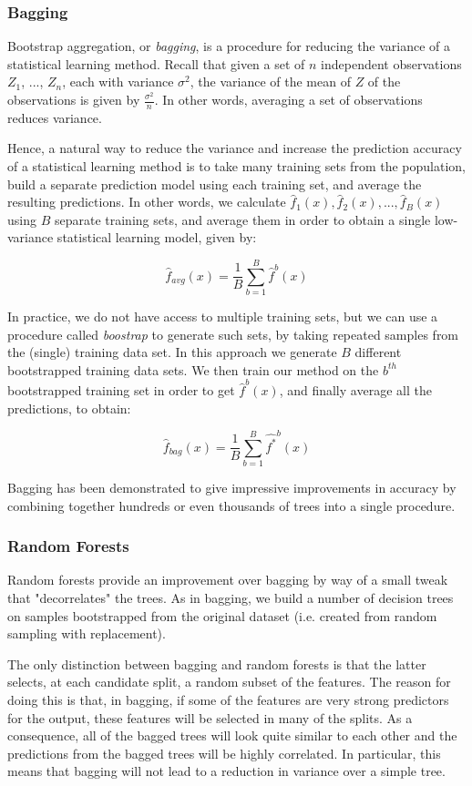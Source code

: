 \subsubsection{Bagging}

Bootstrap aggregation, or \textit{bagging}, is a procedure for reducing the variance of a statistical learning method. Recall that given a set of $n$ independent observations $Z_1$, ..., $Z_n$, each with variance $\sigma^2$, the variance of the mean of $Z$ of the observations is given by $\frac{\sigma^2}{n}$. In other words, averaging a set of observations reduces variance.

Hence, a natural way to reduce the variance and increase the prediction accuracy of a statistical learning method is to take many training sets from the population, build a separate prediction model using each training set, and average the resulting predictions. In other words, we calculate $\hat{f}_1(x), \hat{f}_2(x), ..., \hat{f}_B(x)$ using $B$ separate training sets, and average them in order to obtain a single low-variance statistical learning model, given by:

$$\hat{f}_{avg}(x) = \frac{1}{B} \sum_{b=1}^{B} \hat{f}^b(x)$$

In practice, we do not have access to multiple training sets, but we can use a procedure called \textit{boostrap} to generate such sets, by taking repeated samples from the (single) training data set. In this approach we generate $B$ different bootstrapped training data sets. We then train our method on the $b^{th}$ bootstrapped training set in order to get $\hat{f}^b(x)$, and finally average all the predictions, to obtain:

$$\hat{f}_{bag}(x) = \frac{1}{B} \sum_{b=1}^{B} \hat{f^*}^b(x)$$

Bagging has been demonstrated to give impressive improvements in accuracy by combining together hundreds or even thousands of trees into a single procedure.

\subsubsection{Random Forests}
Random forests provide an improvement over bagging by way of a small tweak that "decorrelates" the trees. As in bagging, we build a number of decision trees on samples bootstrapped from the original dataset (i.e. created from random sampling with replacement).

The only distinction between bagging and random forests is that the latter selects, at each candidate split, a random subset of the features. The reason for doing this is that, in bagging, if some of the features are very strong predictors for the output, these features will be selected in many of the splits. As a consequence, all of the bagged trees will look quite similar to each other and the predictions from the bagged trees will be highly correlated. In particular, this means that bagging will not lead to a reduction in variance over a simple tree.

